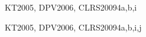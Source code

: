 \begin{syllabus}
\begin{unit}{\ALDistributedAlgorithmsDef}{}{KT2005, DPV2006, CLRS2009}{4}{a,b,i}
   \ALDistributedAlgorithmsAllTopics
   \ALDistributedAlgorithmsAllObjectives
\end{unit}

\begin{unit}{\ALPversusNPDef}{}{KT2005, DPV2006, CLRS2009}{4}{a,b,i,j}
   \ALPversusNPAllTopics
   \ALPversusNPAllObjectives
\end{unit}

\begin{coursebibliography}
\end{coursebibliography}

\end{syllabus}
